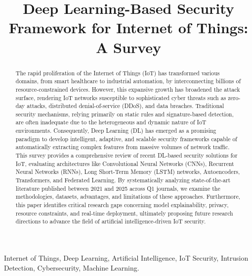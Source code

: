 \documentclass[conference]{IEEEtran}
\begin{document}
\title{Deep Learning-Based Security Framework for Internet of Things: A Survey}

\author{
}

\maketitle

\begin{abstract}
The rapid proliferation of the Internet of Things (IoT) has transformed various domains, from smart healthcare to industrial automation, by interconnecting billions of resource-constrained devices. However, this expansive growth has broadened the attack surface, rendering IoT networks susceptible to sophisticated cyber threats such as zero-day attacks, distributed denial-of-service (DDoS), and data breaches. Traditional security mechanisms, relying primarily on static rules and signature-based detection, are often inadequate due to the heterogeneous and dynamic nature of IoT environments. Consequently, Deep Learning (DL) has emerged as a promising paradigm to develop intelligent, adaptive, and scalable security frameworks capable of automatically extracting complex features from massive volumes of network traffic. This survey provides a comprehensive review of recent DL-based security solutions for IoT, evaluating architectures like Convolutional Neural Networks (CNNs), Recurrent Neural Networks (RNNs), Long Short-Term Memory (LSTM) networks, Autoencoders, Transformers, and Federated Learning. By systematically analyzing state-of-the-art literature published between 2021 and 2025 across Q1 journals, we examine the methodologies, datasets, advantages, and limitations of these approaches. Furthermore, this paper identifies critical research gaps concerning model explainability, privacy, resource constraints, and real-time deployment, ultimately proposing future research directions to advance the field of artificial intelligence-driven IoT security.
\end{abstract}

\begin{IEEEkeywords}
Internet of Things, Deep Learning, Artificial Intelligence, IoT Security, Intrusion Detection, Cybersecurity, Machine Learning.
\end{IEEEkeywords}
\end{document}
